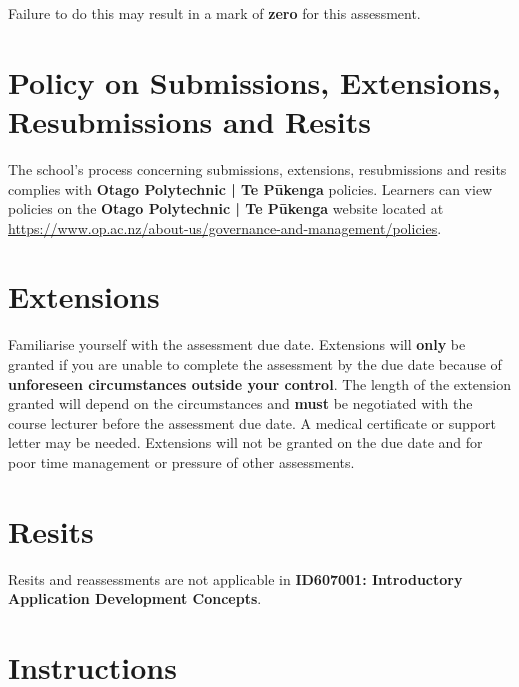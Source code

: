 \documentclass{article}
\begin{document}
 Failure to do this may result in a mark of \textbf{zero} for this assessment.

\section*{Policy on Submissions, Extensions, Resubmissions and Resits}
The school's process concerning submissions, extensions, resubmissions and resits complies with \textbf{Otago Polytechnic | Te Pūkenga} policies. Learners can view policies on the \textbf{Otago Polytechnic | Te Pūkenga} website located at \href{https://www.op.ac.nz/about-us/governance-and-management/policies}{https://www.op.ac.nz/about-us/governance-and-management/policies}. 

\section*{Extensions}
Familiarise yourself with the assessment due date. Extensions will \textbf{only} be granted if you are unable to complete the assessment by the due date because of \textbf{unforeseen circumstances outside your control}. The length of the extension granted will depend on the circumstances and \textbf{must} be negotiated with the course lecturer before the assessment due date. A medical certificate or support letter may be needed. Extensions will not be granted on the due date and for poor time management or pressure of other assessments.

\section*{Resits}
Resits and reassessments are not applicable in \textbf{ID607001: Introductory Application Development Concepts}. 

\newpage

\section*{Instructions}
\end{document}
